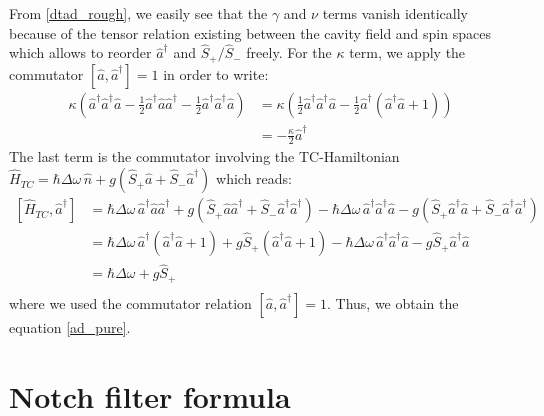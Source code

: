 \documentclass[11pt]{report}
\begin{document}
From \ref{dtad_rough}, we easily see that the $\gamma$ and $\nu$ terms vanish identically because of the tensor relation existing between the cavity field and spin spaces which allows to reorder $\hat{a}^\dag$ and $\hat{S}_+ / \hat{S}_-$ freely. For the $\kappa$ term, we apply the commutator $\left[ \hat{a}, \hat{a}^\dagger \right] = 1$ in order to write:
\begin{equation}
\begin{split}
\kappa \left( \hat{a}^\dagger \hat{a}^\dagger \hat{a} - \frac{1}{2} \hat{a}^\dagger \hat{a} \hat{a}^\dagger - \frac{1}{2} \hat{a}^\dagger \hat{a}^\dagger \hat{a} \right) &= \kappa \left( \frac{1}{2}\hat{a}^\dagger \hat{a}^\dagger \hat{a} - \frac{1}{2} \hat{a}^\dagger (\hat{a}^\dagger \hat{a} + 1) \right)\\
&= -\frac{\kappa}{2} \hat{a}^\dagger
\end{split}
\end{equation}
The last term is the commutator involving the TC-Hamiltonian $\hat{H}_{TC} = \hbar\Delta\omega\,\hat{n} + g \left(\hat{S}_+ \hat{a} + \hat{S}_-\hat{a}^{\dag} \right)$ which reads:
\begin{equation}
\begin{split}
\left[ \hat{H}_{TC}, \hat{a}^\dag \right] &= \hbar\Delta\omega\,\hat{a}^\dag\hat{a}\hat{a}^\dag + g\left(\hat{S}_+ \hat{a}\hat{a}^\dag + \hat{S}_-\hat{a}^{\dag}\hat{a}^\dag \right) - \hbar\Delta\omega\,\hat{a}^\dag\hat{a}^\dag\hat{a} - g\left(\hat{S}_+ \hat{a}^\dag\hat{a} + \hat{S}_-\hat{a}^{\dag}\hat{a}^\dag \right) \\
&= \hbar\Delta\omega\,\hat{a}^\dag(\hat{a}^\dag\hat{a} + 1) + g\hat{S}_+ (\hat{a}^\dag\hat{a} + 1) - \hbar\Delta\omega\,\hat{a}^\dag\hat{a}^\dag\hat{a} - g\hat{S}_+ \hat{a}^\dag\hat{a} \\
&= \hbar\Delta\omega + g\hat{S}_+ \\
\end{split}
\end{equation}
where we used the commutator relation $\left[ \hat{a}, \hat{a}^\dagger \right] = 1$. Thus, we obtain the equation \ref{ad_pure}.

\section{Notch filter formula}
\label{notch_filter_formula}
\end{document}
